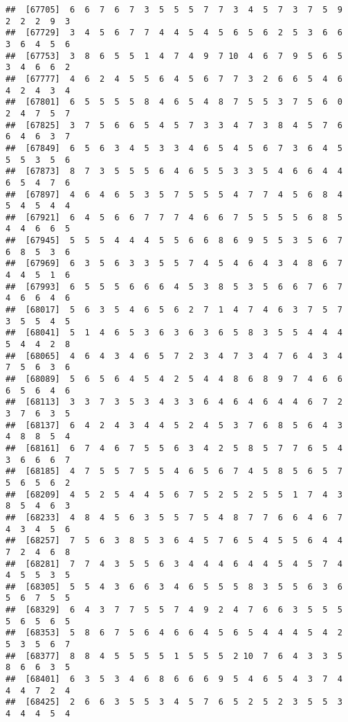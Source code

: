 \documentclass[
]{book}
\begin{document}
\begin{verbatim}
##  [67705]  6  6  7  6  7  3  5  5  5  7  7  3  4  5  7  3  7  5  9  2  2  2  9  3
##  [67729]  3  4  5  6  7  7  4  4  5  4  5  6  5  6  2  5  3  6  6  3  6  4  5  6
##  [67753]  3  8  6  5  5  1  4  7  4  9  7 10  4  6  7  9  5  6  5  3  4  6  6  2
##  [67777]  4  6  2  4  5  5  6  4  5  6  7  7  3  2  6  6  5  4  6  4  2  4  3  4
##  [67801]  6  5  5  5  5  8  4  6  5  4  8  7  5  5  3  7  5  6  0  2  4  7  5  7
##  [67825]  3  7  5  6  6  5  4  5  7  3  3  4  7  3  8  4  5  7  6  6  4  6  3  7
##  [67849]  6  5  6  3  4  5  3  3  4  6  5  4  5  6  7  3  6  4  5  5  5  3  5  6
##  [67873]  8  7  3  5  5  5  6  4  6  5  5  3  3  5  4  6  6  4  4  6  5  4  7  6
##  [67897]  4  6  4  6  5  3  5  7  5  5  5  4  7  7  4  5  6  8  4  5  4  5  4  4
##  [67921]  6  4  5  6  6  7  7  7  4  6  6  7  5  5  5  5  6  8  5  4  4  6  6  5
##  [67945]  5  5  5  4  4  4  5  5  6  6  8  6  9  5  5  3  5  6  7  6  8  5  3  6
##  [67969]  6  3  5  6  3  3  5  5  7  4  5  4  6  4  3  4  8  6  7  4  4  5  1  6
##  [67993]  6  5  5  5  6  6  6  4  5  3  8  5  3  5  6  6  7  6  7  4  6  6  4  6
##  [68017]  5  6  3  5  4  6  5  6  2  7  1  4  7  4  6  3  7  5  7  3  5  5  4  5
##  [68041]  5  1  4  6  5  3  6  3  6  3  6  5  8  3  5  5  4  4  4  5  4  4  2  8
##  [68065]  4  6  4  3  4  6  5  7  2  3  4  7  3  4  7  6  4  3  4  7  5  6  3  6
##  [68089]  5  6  5  6  4  5  4  2  5  4  4  8  6  8  9  7  4  6  6  6  5  6  4  6
##  [68113]  3  3  7  3  5  3  4  3  3  6  4  6  4  6  4  4  6  7  2  3  7  6  3  5
##  [68137]  6  4  2  4  3  4  4  5  2  4  5  3  7  6  8  5  6  4  3  4  8  8  5  4
##  [68161]  6  7  4  6  7  5  5  6  3  4  2  5  8  5  7  7  6  5  4  3  6  6  6  7
##  [68185]  4  7  5  5  7  5  5  4  6  5  6  7  4  5  8  5  6  5  7  5  6  5  6  2
##  [68209]  4  5  2  5  4  4  5  6  7  5  2  5  2  5  5  1  7  4  3  8  5  4  6  3
##  [68233]  4  8  4  5  6  3  5  5  7  5  4  8  7  7  6  6  4  6  7  4  3  4  5  6
##  [68257]  7  5  6  3  8  5  3  6  4  5  7  6  5  4  5  5  6  4  4  7  2  4  6  8
##  [68281]  7  7  4  3  5  5  6  3  4  4  4  6  4  4  5  4  5  7  4  4  5  5  3  5
##  [68305]  5  5  4  3  6  6  3  4  6  5  5  5  8  3  5  5  6  3  6  5  6  7  5  5
##  [68329]  6  4  3  7  7  5  5  7  4  9  2  4  7  6  6  3  5  5  5  5  6  5  6  5
##  [68353]  5  8  6  7  5  6  4  6  6  4  5  6  5  4  4  4  5  4  2  5  3  5  6  7
##  [68377]  8  8  4  5  5  5  5  1  5  5  5  2 10  7  6  4  3  3  5  8  6  6  3  5
##  [68401]  6  3  5  3  4  6  8  6  6  6  9  5  4  6  5  4  3  7  4  4  4  7  2  4
##  [68425]  2  6  6  3  5  5  3  4  5  7  6  5  2  5  2  3  5  5  3  4  4  4  5  4

\end{verbatim}
\end{document}
